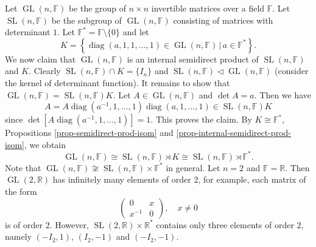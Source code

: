 \begin{example}
	Let $\operatorname{GL}(n,\mathbb{F})$ be the group of $n\times n$ invertible matrices over a field $\mathbb{F}$. Let $\operatorname{SL}(n,\mathbb{F})$ be the subgroup of $\operatorname{GL}(n,\mathbb{F})$ consisting of matrices with determinant $1$. Let $\mathbb{F}^* = \mathbb{F}\setminus \{0\}$ and let
	\begin{equation*}
		K = \left\{ \operatorname{diag}(a,1,1,\dots, 1)\in \operatorname{GL}(n,\mathbb{F}) \,|\, a\in\mathbb{F}^*\right\}.
	\end{equation*}
	We now claim that $\operatorname{GL}(n,\mathbb{F})$ is an internal semidirect product of $\operatorname{SL}(n,\mathbb{F})$ and $K$. Clearly $\operatorname{SL}(n,\mathbb{F})\cap K = \{I_n\}$ and $\operatorname{SL}(n,\mathbb{F}) \lhd \operatorname{GL}(n,\mathbb{F})$ (consider the kernel of determinant function). It remains to show that $\operatorname{GL}(n,\mathbb{F}) = \operatorname{SL}(n,\mathbb{F})K$. Let $A\in \operatorname{GL}(n,\mathbb{F})$ and $\det A = a$. Then we have 
	\begin{equation*}
		A = A\operatorname{diag}(a^{-1},1,\dots, 1)\operatorname{diag}(a,1,\dots, 1) \in \operatorname{SL}(n,\mathbb{F})K
	\end{equation*}
	since $\det [A\operatorname{diag}(a^{-1},1,\dots, 1)] = 1$. This proves the claim. By $K \cong \mathbb{F}^*$, Propositions \ref{prop-semidirect-prod-isom} and \ref{prop-internal-semidirect-prod-isom}, we obtain
	\begin{equation*}
		\operatorname{GL}(n,\mathbb{F}) \cong \operatorname{SL}(n,\mathbb{F})\rtimes K \cong \operatorname{SL}(n,\mathbb{F})\rtimes\mathbb{F}^*.
	\end{equation*}
	Note that $\operatorname{GL}(n,\mathbb{F}) \not\cong \operatorname{SL}(n,\mathbb{F})\times\mathbb{F}^*$ in general. Let $n = 2$ and $\mathbb{F} = \mathbb{R}$. Then $\operatorname{GL}(2,\mathbb{R})$ has infinitely many elements of order $2$, for example, each matrix of the form
	\begin{equation*}
		\begin{pmatrix}
			0 & x\\
			x^{-1} & 0
		\end{pmatrix},\quad x\neq 0
	\end{equation*}
	is of order $2$. However, $\operatorname{SL}(2,\mathbb{R})\times\mathbb{R}^*$  contains only three elements of order $2$, namely $(-I_2,1)$, $(I_2, -1)$ and $(-I_2,-1)$.
\end{example}

